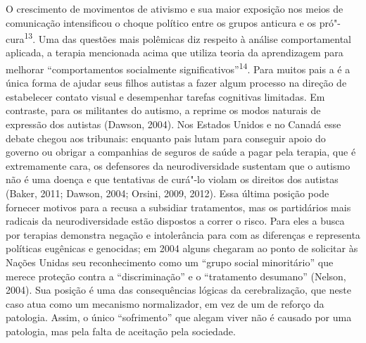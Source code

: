 O crescimento de movimentos de ativismo e sua maior exposição nos meios
de comunicação intensificou o choque político entre os grupos anticura e
os pró"-cura\textsuperscript{13}. Uma das questões mais polêmicas diz
respeito à análise comportamental aplicada, a terapia mencionada acima
que utiliza teoria da aprendizagem para melhorar ``comportamentos
socialmente significativos''\textsuperscript{14}. Para muitos pais a 
é a única forma de ajudar seus filhos autistas a fazer algum processo na
direção de estabelecer contato visual e desempenhar tarefas cognitivas
limitadas. Em contraste, para os militantes do autismo, a  reprime os
modos naturais de expressão dos autistas (Dawson, 2004). Nos Estados
Unidos e no Canadá esse debate chegou aos tribunais: enquanto pais lutam
para conseguir apoio do governo ou obrigar a companhias de seguros de
saúde a pagar pela terapia, que é extremamente cara, os defensores da
neurodiversidade sustentam que o autismo não é uma doença e que
tentativas de curá"-lo violam os direitos dos autistas (Baker, 2011;
Dawson, 2004; Orsini, 2009, 2012). Essa última posição pode fornecer
motivos para a recusa a subsidiar tratamentos, mas os partidários mais
radicais da neurodiversidade estão dispostos a correr o risco. Para eles
a busca por terapias demonstra negação e intolerância para com as
diferenças e representa políticas eugênicas e genocidas; em 2004 alguns
chegaram ao ponto de solicitar às Nações Unidas seu reconhecimento como
um ``grupo social minoritário'' que merece proteção contra a
``discriminação'' e o ``tratamento desumano'' (Nelson, 2004). Sua
posição é uma das consequências lógicas da cerebralização, que neste
caso atua como um mecanismo normalizador, em vez de um de reforço da
patologia. Assim, o único ``sofrimento'' que alegam viver não é causado
por uma patologia, mas pela falta de aceitação pela sociedade.

